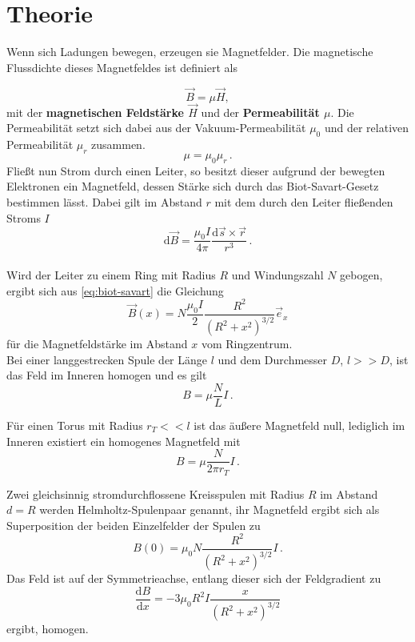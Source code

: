 \section{Theorie}
\label{sec:Theorie}
Wenn sich Ladungen bewegen, erzeugen sie Magnetfelder. Die magnetische Flussdichte
dieses Magnetfeldes ist definiert als

\begin{equation}
    \label{eq:BmuH}
    \vec{B}=μ\vec{H},
\end{equation}
mit der \textbf{magnetischen Feldstärke $\vec{H}$} und der \textbf{Permeabilität $μ$}.
Die Permeabilität setzt sich dabei aus der Vakuum-Permeabilität $μ_0$ und der relativen
Permeabilität $μ_r$ zusammen.
\begin{equation}
    μ = μ_0μ_r\,.
\end{equation}
Fließt nun Strom durch einen Leiter, so besitzt dieser aufgrund der bewegten Elektronen
ein Magnetfeld, dessen Stärke sich durch das Biot-Savart-Gesetz bestimmen lässt.
Dabei gilt im Abstand $r$ mit dem durch den Leiter fließenden Stroms $I$
\begin{equation}
    \label{eq:biot-savart}
    \text{d}\vec{B}= \dfrac{μ_0 I}{4π} \dfrac{\text{d}\vec{s} \times \vec{r}}{r^3}\,.
\end{equation}\\

Wird der Leiter zu einem Ring mit Radius $R$ und Windungszahl $N$ gebogen, ergibt sich
aus \eqref{eq:biot-savart} die Gleichung
\begin{equation}
    \vec{B}(x) = N\dfrac{μ_0I}{2}\dfrac{R^2}{(R^2+x^2)^{3/2}} \vec{e}_x
    \label{eq:BFeld}
\end{equation}
für die Magnetfeldstärke im Abstand $x$ vom Ringzentrum.\\

Bei einer langgestrecken Spule der Länge $l$ und dem Durchmesser $D$, $l>>D$, ist das Feld im
Inneren homogen und es gilt
\begin{equation}
    B=μ\dfrac{N}{L}I\,.
    \label{LangB}
\end{equation} 

Für einen Torus mit Radius $r_T<<l$ ist das äußere Magnetfeld null, lediglich im Inneren
existiert ein homogenes Magnetfeld mit
\begin{equation}
    B=μ\dfrac{N}{2πr_T}I\,.
    \label{RingB}
\end{equation}

Zwei gleichsinnig stromdurchflossene Kreisspulen mit Radius $R$ im Abstand $d=R$ werden
Helmholtz-Spulenpaar genannt, ihr Magnetfeld ergibt sich als Superposition der beiden
Einzelfelder der Spulen zu
\begin{equation}
    B(0)=μ_0N\dfrac{R^2}{(R^2+x^2)^{3/2}}I\,.
    \label{eq:HelmholtzB}
\end{equation}
Das Feld ist auf der Symmetrieachse, entlang dieser sich der Feldgradient zu
\begin{equation}
    \dfrac{\text{d}B}{\text{d}x} = -3μ_0R^2I\dfrac{x}{(R^2+x^2)^{3/2}}
\end{equation} ergibt, homogen.

